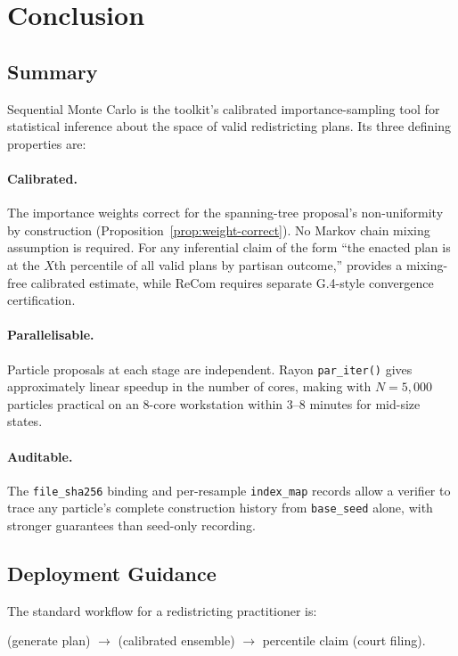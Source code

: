 \section{Conclusion}
\label{sec:conclusion}

\subsection{Summary}

Sequential Monte Carlo is the toolkit's calibrated importance-sampling tool for
statistical inference about the space of valid redistricting plans.
Its three defining properties are:

\paragraph{Calibrated.}
The importance weights correct for the spanning-tree proposal's non-uniformity
by construction (Proposition~\ref{prop:weight-correct}).
No Markov chain mixing assumption is required.
For any inferential claim of the form ``the enacted plan is at the $X$th
percentile of all valid plans by partisan outcome,'' \smc{} provides a
mixing-free calibrated estimate, while ReCom requires separate G.4-style
convergence certification.

\paragraph{Parallelisable.}
Particle proposals at each stage are independent.
Rayon \texttt{par\_iter()} gives approximately linear speedup in the number
of cores, making \smc{} with $N = 5{,}000$ particles practical on an 8-core
workstation within 3--8 minutes for mid-size states.

\paragraph{Auditable.}
The \texttt{file\_sha256} binding and per-resample \texttt{index\_map} records
allow a verifier to trace any particle's complete construction history from
\texttt{base\_seed} alone, with stronger guarantees than seed-only recording.

\subsection{Deployment Guidance}

The standard workflow for a redistricting practitioner is:
\begin{center}
  \cs{} (generate plan) $\to$ \smc{} (calibrated ensemble) $\to$
  percentile claim (court filing).
\end{center}

